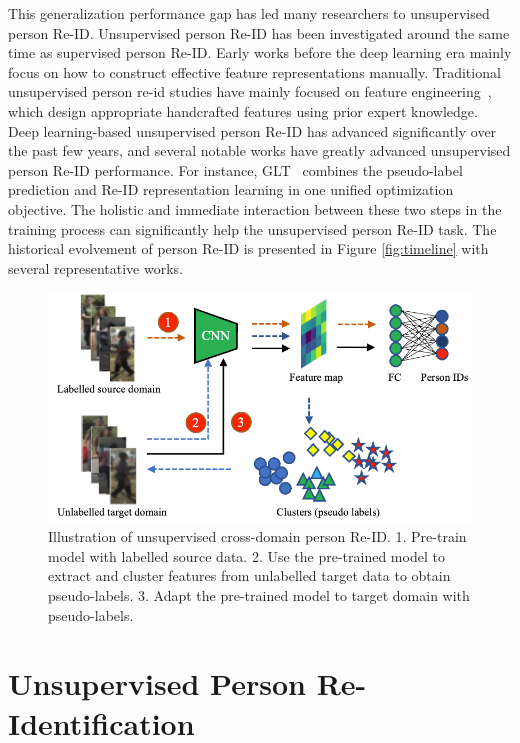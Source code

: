 \documentclass[a4paper,fleqn]{cas-dc}
\begin{document}
This generalization performance gap has led many researchers to unsupervised person Re-ID. Unsupervised person Re-ID has been investigated around the same time as supervised person Re-ID. Early works before the deep learning era mainly focus on how to construct effective feature representations manually. Traditional unsupervised person re-id studies have mainly focused on feature
engineering~\cite{farenzena_person_2010,gray_viewpoint_2008,zhao_unsupervised_2013}, which design appropriate handcrafted features using prior expert knowledge. Deep learning-based unsupervised person Re-ID has advanced significantly over the past few years, and several notable works have greatly advanced unsupervised person Re-ID performance. For instance, GLT~\cite{zheng_group-aware_2021} combines the pseudo-label prediction and Re-ID representation learning in one unified optimization objective. The holistic and immediate interaction between these two steps in the training process can significantly help the unsupervised person Re-ID task. The historical evolvement of person Re-ID is presented in Figure \ref{fig:timeline} with several representative works.
\begin{figure}[t]
\begin{center}
\includegraphics [width=.75\linewidth]{clustering.PNG}
\end{center}
  \caption{Illustration of unsupervised cross-domain person Re-ID. 1. Pre-train model with labelled source data. 2. Use the pre-trained model to extract and cluster features from unlabelled target data to obtain pseudo-labels. 3. Adapt the pre-trained model to target domain with pseudo-labels.}
\label{fig:clustering}
\end{figure}
\section{Unsupervised Person Re-Identification}\label{main}
\end{document}
